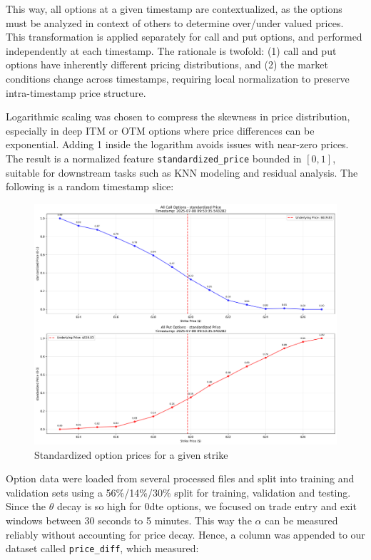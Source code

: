 \documentclass{article}
\begin{document}
This way, all options at a given timestamp are contextualized, as the options must be analyzed in context of others to determine over/under valued prices. This transformation is applied separately for call and put options, and performed independently at each timestamp. The rationale is twofold: (1) call and put options have inherently different pricing distributions, and (2) the market conditions change across timestamps, requiring local normalization to preserve intra-timestamp price structure. 

Logarithmic scaling was chosen to compress the skewness in price distribution, especially in deep ITM or OTM options where price differences can be exponential. Adding 1 inside the logarithm avoids issues with near-zero prices. The result is a normalized feature \texttt{standardized\_price} bounded in \([0, 1]\), suitable for downstream tasks such as KNN modeling and residual analysis. The following is a random timestamp slice:
\begin{figure}[h]
  \centering
  \includegraphics[width=1\linewidth]{calls_puts_timestamp_329}
  \caption{Standardized option prices for a given strike}
  \label{fig:price-std}
\end{figure}

Option data were loaded from several processed files and split into training and validation sets using a 56\%/14\%/30\% split for training, validation and testing. 
Since the $\theta$ decay is so high for 0dte options, we focused on trade entry and exit windows between 30 seconds to 5 minutes. This way the $\alpha$ can be measured reliably without accounting for price decay. Hence, a column was appended to our dataset called \texttt{price\_diff}, which measured:
\end{document}
